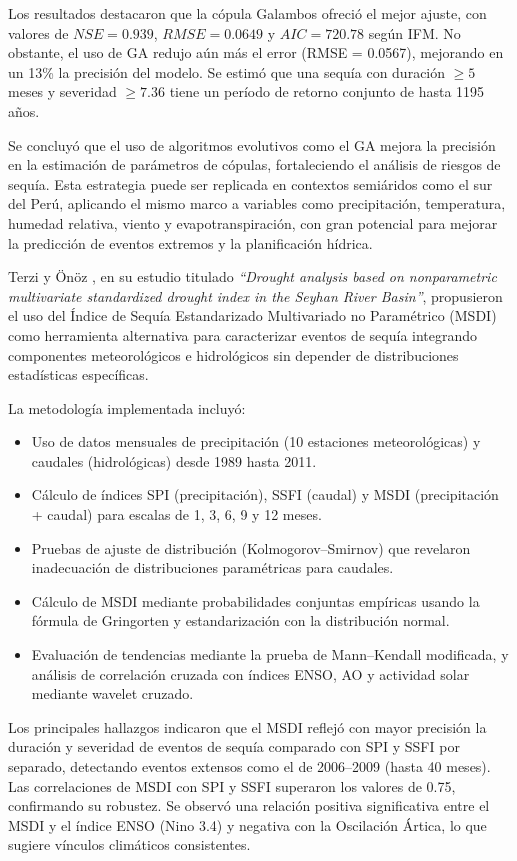 Los resultados destacaron que la cópula Galambos ofreció el mejor ajuste, con valores de $NSE = 0.939$, $RMSE = 0.0649$ y $AIC = 720.78$ según IFM. No obstante, el uso de GA redujo aún más el error (RMSE = 0.0567), mejorando en un 13\% la precisión del modelo. Se estimó que una sequía con duración $\geq 5$ meses y severidad $\geq 7.36$ tiene un período de retorno conjunto de hasta 1195 años.

Se concluyó que el uso de algoritmos evolutivos como el GA mejora la precisión en la estimación de parámetros de cópulas, fortaleciendo el análisis de riesgos de sequía. Esta estrategia puede ser replicada en contextos semiáridos como el sur del Perú, aplicando el mismo marco a variables como precipitación, temperatura, humedad relativa, viento y evapotranspiración, con gran potencial para mejorar la predicción de eventos extremos y la planificación hídrica.


Terzi y Önöz \textcite{Terzi2025b}, en su estudio titulado \textit{“Drought analysis based on nonparametric multivariate standardized drought index in the Seyhan River Basin”}, propusieron el uso del Índice de Sequía Estandarizado Multivariado no Paramétrico (MSDI) como herramienta alternativa para caracterizar eventos de sequía integrando componentes meteorológicos e hidrológicos sin depender de distribuciones estadísticas específicas.

La metodología implementada incluyó:
\begin{itemize}
    \item Uso de datos mensuales de precipitación (10 estaciones meteorológicas) y caudales (hidrológicas) desde 1989 hasta 2011.
    \item Cálculo de índices SPI (precipitación), SSFI (caudal) y MSDI (precipitación + caudal) para escalas de 1, 3, 6, 9 y 12 meses.
    \item Pruebas de ajuste de distribución (Kolmogorov–Smirnov) que revelaron inadecuación de distribuciones paramétricas para caudales.
    \item Cálculo de MSDI mediante probabilidades conjuntas empíricas usando la fórmula de Gringorten y estandarización con la distribución normal.
    \item Evaluación de tendencias mediante la prueba de Mann–Kendall modificada, y análisis de correlación cruzada con índices ENSO, AO y actividad solar mediante wavelet cruzado.
\end{itemize}

Los principales hallazgos indicaron que el MSDI reflejó con mayor precisión la duración y severidad de eventos de sequía comparado con SPI y SSFI por separado, detectando eventos extensos como el de 2006–2009 (hasta 40 meses). Las correlaciones de MSDI con SPI y SSFI superaron los valores de 0.75, confirmando su robustez. Se observó una relación positiva significativa entre el MSDI y el índice ENSO (Nino 3.4) y negativa con la Oscilación Ártica, lo que sugiere vínculos climáticos consistentes.

